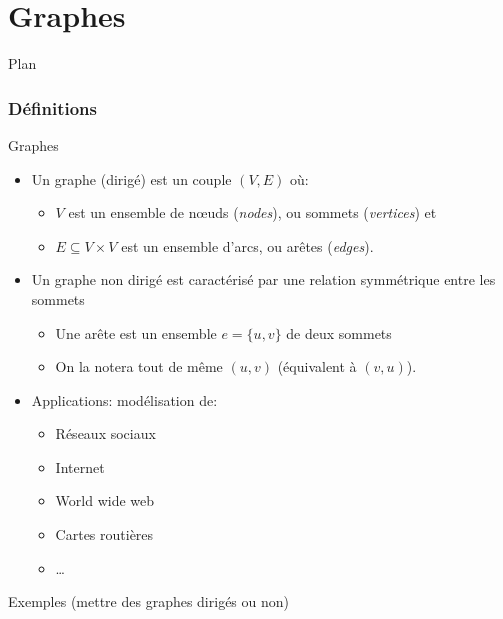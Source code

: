 \part{Graphes}

\begin{frame}{Plan}

\tableofcontents

\end{frame}

\section{Définitions}

\begin{frame}{Graphes}

\begin{itemize}
\item Un \alert{graphe (dirigé)}  est un couple $(V,E)$ où:
\begin{itemize}
\item $V$ est un ensemble de n\oe uds ({\it nodes}), ou sommets ({\it vertices}) et
\item $E\subseteq V\times V$ est un ensemble d'arcs, ou arêtes ({\it edges}).
\end{itemize}
\item Un graphe \alert{non dirigé} est caractérisé par une relation symmétrique entre les sommets
\begin{itemize}
\item Une arête est un ensemble $e=\{u,v\}$ de deux sommets
\item On la notera tout de même $(u,v)$ (équivalent à $(v,u)$). 
\end{itemize}

\item Applications: modélisation de:
\begin{itemize}
\item Réseaux sociaux
\item Internet
\item World wide web
\item Cartes routières
\item \ldots
\end{itemize}
\end{itemize}

\end{frame}

\begin{frame}{Exemples}
(mettre des graphes dirigés ou non)
\end{frame}

